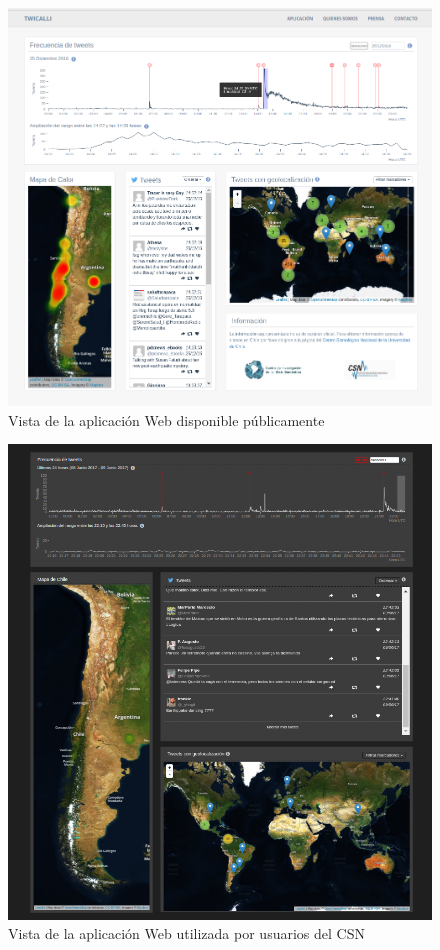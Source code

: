 	\begin{figure}[ht]
	  \centering
	  \includegraphics[trim={0 0 0 0}, clip, width=\textwidth]{imagenes/aplicacionexplorar.png}
	  \caption{Vista de la aplicación Web disponible públicamente}
	\label{fig:webapp}
	\end{figure}
	
	\begin{figure}[ht]
	  \centering
	  \includegraphics[trim={0 0 0 0}, clip, width=\textwidth]{imagenes/aplicacionexplorar_csn.png}
	  \caption{Vista de la aplicación Web utilizada por usuarios del CSN}
	\label{fig:webapp_csn}
	\end{figure}


